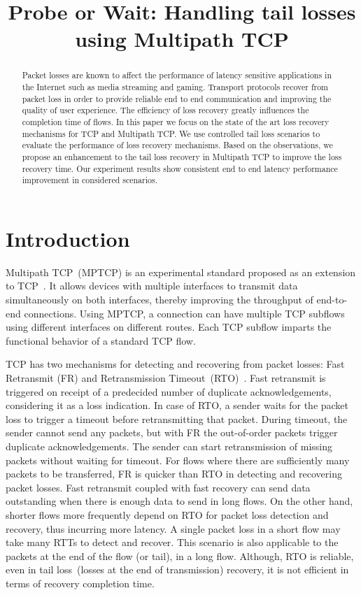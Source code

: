 \documentclass[10pt,conference,compsoc]{IEEEtran}
\title{Probe or Wait: Handling tail losses using Multipath TCP}
\author{\IEEEauthorblockN{Kiran~Yedugundla, Per~Hurtig, Anna~Brunstrom}
\IEEEauthorblockA{Dept. of Computer Science, Karlstad University, Karlstad, Sweden}}
\begin{document}
\maketitle

\begin{abstract}
Packet losses are known to affect the performance of latency sensitive applications in the Internet such as media streaming and gaming. Transport protocols recover from packet loss in order to provide reliable end to end communication and improving the quality of user experience. The efficiency of loss recovery greatly influences the completion time of flows. In this paper we focus on the state of the art loss recovery mechanisms for TCP and Multipath TCP. We use controlled tail loss scenarios to evaluate the performance of loss recovery mechanisms. Based on the observations, we propose an enhancement to the tail loss recovery in Multipath TCP to improve the loss recovery time. Our experiment results show consistent end to end latency performance improvement in considered scenarios. 
\end{abstract}

\section{Introduction}


Multipath TCP~(MPTCP) is an experimental standard proposed as an extension to TCP~\cite{rfc6824}. It allows devices with multiple interfaces to transmit data simultaneously on both interfaces, thereby improving the throughput of end-to-end connections. Using MPTCP, a connection can have multiple TCP subflows using different interfaces on different routes. Each TCP subflow imparts the functional behavior of a standard TCP flow. 

TCP has two mechanisms for detecting and recovering from packet losses: Fast Retransmit (FR) and Retransmission Timeout~(RTO)~\cite{Flach:2013}. Fast retransmit is triggered on receipt of a predecided number of duplicate acknowledgements, considering it as a loss indication. In case of RTO, a sender waits for the packet loss to trigger a timeout before retransmitting that packet. During timeout, the sender cannot send any packets, but with FR the out-of-order packets trigger duplicate acknowledgements. The sender can start retransmission of missing packets without waiting for timeout. For flows where there are sufficiently many packets to be transferred, FR is quicker than RTO in detecting and recovering packet losses. Fast retransmit coupled with fast recovery can send data outstanding when there is enough data to send in long flows. On the other hand, shorter flows more frequently depend on RTO for packet loss detection and recovery, thus incurring more latency. A single packet loss in a short flow may take many RTTs to detect and recover. This scenario is also applicable to the packets at the end of the flow (or tail), in a long flow. Although, RTO is reliable, even in tail loss~(losses at the end of transmission) recovery, it is not efficient in terms of recovery completion time. 
\end{document}
